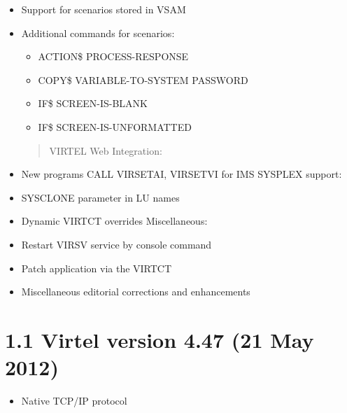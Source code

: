 \documentclass[letterpaper,10pt,english]{sphinxmanual}
\begin{document}
\begin{itemize}
\item {} 
Support for scenarios stored in VSAM

\item {} 
Additional commands for scenarios:
\begin{itemize}
\item {} 
ACTION\$ PROCESS-RESPONSE

\item {} 
COPY\$ VARIABLE-TO-SYSTEM PASSWORD

\item {} 
IF\$ SCREEN-IS-BLANK

\item {} 
IF\$ SCREEN-IS-UNFORMATTED

\end{itemize}
\begin{quote}

VIRTEL Web Integration:
\end{quote}

\item {} 
New programs CALL VIRSETAI, VIRSETVI for IMS SYSPLEX support:

\item {} 
SYSCLONE parameter in LU names

\item {} 
Dynamic VIRTCT overrides Miscellaneous:

\item {} 
Restart VIRSV service by console command

\item {} 
Patch application via the VIRTCT

\item {} 
Miscellaneous editorial corrections and enhancements

\end{itemize}


\section{1.1 Virtel version 4.47 (21 May 2012)}
\label{\detokenize{Installation_Guide:virtel-version-4-47-21-may-2012}}
\begin{itemize}
\item {} 
Native TCP/IP protocol

\end{itemize}
\end{document}
